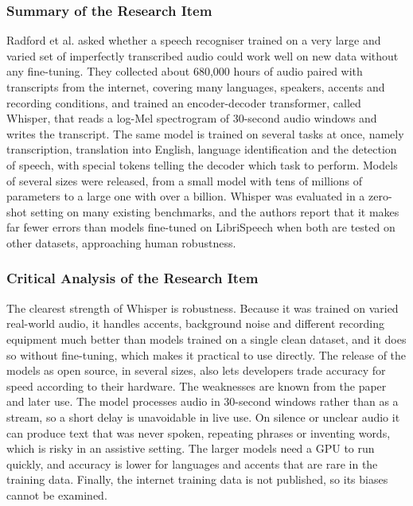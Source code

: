 \documentclass{FastFyp}
\begin{document}
\subsubsection*{Summary of the Research Item}
Radford et al. \cite{radford2023whisper} asked whether a speech recogniser trained on a very large and varied set of imperfectly transcribed audio could work well on new data without any fine-tuning. They collected about 680,000 hours of audio paired with transcripts from the internet, covering many languages, speakers, accents and recording conditions, and trained an encoder-decoder transformer, called Whisper, that reads a log-Mel spectrogram of 30-second audio windows and writes the transcript. The same model is trained on several tasks at once, namely transcription, translation into English, language identification and the detection of speech, with special tokens telling the decoder which task to perform. Models of several sizes were released, from a small model with tens of millions of parameters to a large one with over a billion. Whisper was evaluated in a zero-shot setting on many existing benchmarks, and the authors report that it makes far fewer errors than models fine-tuned on LibriSpeech when both are tested on other datasets, approaching human robustness.

\subsubsection*{Critical Analysis of the Research Item}
The clearest strength of Whisper is robustness. Because it was trained on varied real-world audio, it handles accents, background noise and different recording equipment much better than models trained on a single clean dataset, and it does so without fine-tuning, which makes it practical to use directly. The release of the models as open source, in several sizes, also lets developers trade accuracy for speed according to their hardware. The weaknesses are known from the paper and later use. The model processes audio in 30-second windows rather than as a stream, so a short delay is unavoidable in live use. On silence or unclear audio it can produce text that was never spoken, repeating phrases or inventing words, which is risky in an assistive setting. The larger models need a GPU to run quickly, and accuracy is lower for languages and accents that are rare in the training data. Finally, the internet training data is not published, so its biases cannot be examined.
\end{document}
